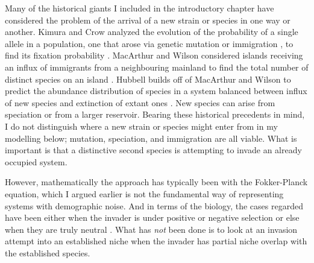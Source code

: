 Many of the historical giants I included in the introductory chapter have considered the problem of the arrival of a new strain or species in one way or another. 
Kimura and Crow analyzed the evolution of the probability of a single allele in a population, one that arose via genetic mutation or immigration , to find its fixation probability \cite{Crow1956,Kimura1964,Kimura1968}. 
MacArthur and Wilson considered islands receiving an influx of immigrants from a neighbouring mainland to find the total number of distinct species on an island \cite{MacArthur1963,MacArthur1967}. 
Hubbell builds off of MacArthur and Wilson to predict the abundance distribution of species in a system balanced between influx of new species and extinction of extant ones \cite{Hubbell2001}. 
New species can arise from speciation or from a larger reservoir. 
Bearing these historical precedents in mind, I do not distinguish where a new strain or species might enter from in my modelling below; mutation, speciation, and immigration are all viable. 
What is important is that a distinctive second species is attempting to invade an already occupied system. 

However, mathematically the approach has typically been with the Fokker-Planck equation, which I argued earlier is not the fundamental way of representing systems with demographic noise. %
And in terms of the biology, the cases regarded have been either when the invader is under positive or negative selection \cite{Kimura1955} or else when they are truly neutral \cite{Kimura1956,Hubbell2001}. %
What has \emph{not} been done is to look at an invasion attempt into an established niche when the invader has partial niche overlap with the established species. 

